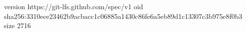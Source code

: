 version https://git-lfs.github.com/spec/v1
oid sha256:3310ece23462b9acbacc1c06885a1430c86fe6a5eb89d1c13307c3b975e8f0b3
size 2716
